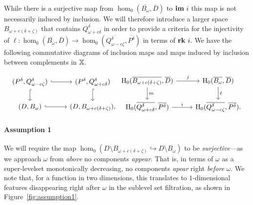 While there is a surjective map from $\hom_0(\overline{B_\omega}, \overline{D})$ to $\mathbf{im}~i$ this map is not necessarily induced by inclusion.
We will therefore introduce a larger space $B_{\omega+c(\delta+\zeta)}$ that contains $Q_{\omega+c\delta}^\delta$ in order to provide a criteria for the injectivity of $\ell : \hom_0(\overline{B_\omega}, \overline{D})\to\hom_0(\overline{Q_{\omega-c\zeta}^\delta}, \overline{P^\delta})$ in terms of $\mathbf{rk}~i$.
We have the following commutative diagrams of inclusion maps and maps induced by inclusion between complements in $\mathbb{X}$.

\begin{equation}\label{dgm:1}
\begin{tikzcd}
  (P^\delta, Q_{\omega-c\zeta}^\delta) \arrow[hookrightarrow]{r}\arrow[hookrightarrow]{d} &
  (P^\delta, Q_{\omega+c\delta}^\delta) \arrow[hookrightarrow]{d} \\
  (D, B_\omega) \arrow[hookrightarrow]{r} &
  (D, B_{\omega+c(\delta+\zeta)}),
\end{tikzcd}
\begin{tikzcd}
  \hom_0(\overline{B_{\omega+c(\delta+\zeta)}},\overline{D})\arrow{d}{m} \arrow{r}{j} &
  \hom_0(\overline{B_\omega}, \overline{D}) \arrow{d}{\ell} \\
  \hom_0(\overline{Q_{\omega+c\delta}^\delta}, \overline{P^\delta}) \arrow{r}{i} &
  \hom_0(\overline{Q_{\omega-c\zeta}^\delta}, \overline{P^\delta}).
\end{tikzcd}\end{equation}

\paragraph{Assumption 1}

We will require the map $\hom_0(D\setminus B_{\omega+c(\delta+\zeta)}\hookrightarrow D\setminus B_\omega)$ to be \emph{surjective}---as we approach $\omega$ from \emph{above} no components \emph{appear}.
That is, in terms of $\omega$ as a super-levelset monotonically decreasing, no components \emph{apear} right \emph{before} $\omega$.
We note that, for a function in two dimensions, this translates to $1$-dimensional features disappearing right after $\omega$ in the sublevel set filtration, as shown in Figure~\ref{fig:assumption1}.

